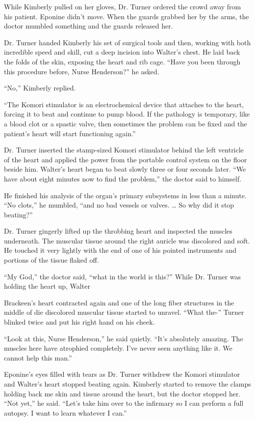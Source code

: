 \documentclass[]{article}
\begin{document}
{While Kimberly pulled on her gloves, Dr.  Turner ordered the crowd away from his patient.  Eponine didn’t move.  When the guards grabbed her by the arms, the doctor mumbled something and the guards released her.

Dr.  Turner handed Kimberly his set of surgical tools and then, working with both incredible speed and skill, cut a deep incision into Walter’s chest.  He laid back the folds of the skin, exposing the heart and rib cage.  “Have you been through this procedure before, Nurse Henderson?” he asked.

“No,” Kimberly replied.

“The Komori stimulator is an electrochemical device that attaches to the heart, forcing it to beat and continue to pump blood.  If the pathology is temporary, like a blood clot or a spastic valve, then sometimes the problem can be fixed and the patient’s heart will start functioning again.”

Dr.  Turner inserted the stamp-sized Komori stimulator behind the left ventricle of the heart and applied the power from the portable control system on the floor beside him.  Walter’s heart began to beat slowly three or four seconds later.  “We have about eight minutes now to find the problem,” the doctor said to himself.

He finished his analysis of the organ’s primary subsystems in less than a minute.  “No clots,” he mumbled, “and no bad vessels or valves.  … So why did it stop beating?”

Dr.  Turner gingerly lifted up the throbbing heart and inspected the muscles underneath.  The muscular tissue around the right auricle was discolored and soft.  He touched it very lightly with the end of one of his pointed instruments and portions of the tissue flaked off.

“My God,” the doctor said, “what in the world is this?” While Dr.  Turner was holding the heart up, Walter

Brackeen’s heart contracted again and one of the long fiber structures in the middle of die discolored muscular tissue started to unravel.  “What the-” Turner blinked twice and put his right hand on his cheek.

“Look at this, Nurse Henderson,” he said quietly.  “It’s absolutely amazing.  The muscles here have atrophied completely.  I’ve never seen anything like it.  We cannot help this man.”

Eponine’s eyes filled with tears as Dr.  Turner withdrew the Komori stimulator and Walter’s heart stopped beating again.  Kimberly started to remove the clamps holding back me skin and tissue around the heart, but the doctor stopped her.  “Not yet,” he said.  “Let’s take him over to the infirmary so I can perform a full autopsy.  I want to learn whatever I can.”

}
\end{document}

